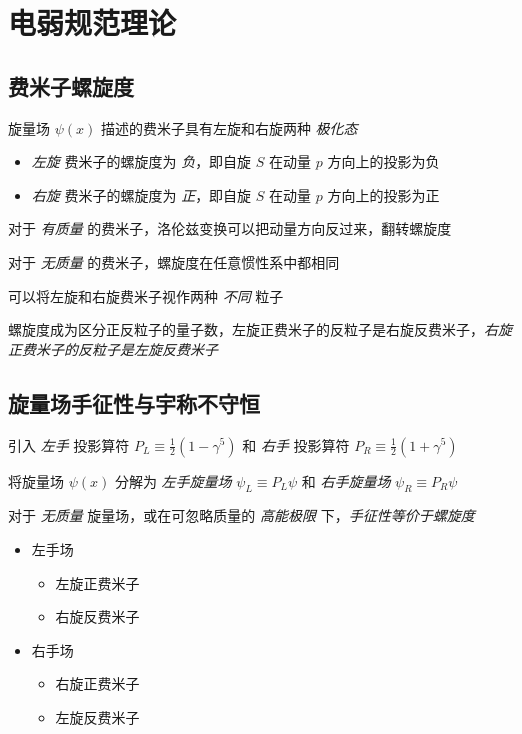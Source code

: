 \section{电弱规范理论}

\subsection{费米子螺旋度}

旋量场 $\psi(x)$ 描述的费米子具有左旋和右旋两种 \emph{极化态}

\begin{itemize}
    \item \emph{左旋} 费米子的螺旋度为 \emph{负}，即自旋 $S$ 在动量 $p$ 方向上的投影为负
    \item \emph{右旋} 费米子的螺旋度为 \emph{正}，即自旋 $S$ 在动量 $p$ 方向上的投影为正
\end{itemize}

对于 \emph{有质量} 的费米子，洛伦兹变换可以把动量方向反过来，翻转螺旋度

对于 \emph{无质量} 的费米子，螺旋度在任意惯性系中都相同

可以将左旋和右旋费米子视作两种 \emph{不同} 粒子

螺旋度成为区分正反粒子的量子数，左旋正费米子的反粒子是右旋反费米子，\emph{右旋正费米子的反粒子是左旋反费米子}

\subsection{旋量场手征性与宇称不守恒}

引入 \emph{左手} 投影算符 $P_L \equiv \frac{1}{2} (1-\gamma^5)$ 和 \emph{右手} 投影算符 $P_R \equiv \frac{1}{2} (1+\gamma^5)$

将旋量场 $\psi(x)$ 分解为 \emph{左手旋量场} $\psi_L \equiv P_L \psi$ 和 \emph{右手旋量场} $\psi_R \equiv P_R \psi$

对于 \emph{无质量} 旋量场，或在可忽略质量的 \emph{高能极限} 下，\emph{手征性等价于螺旋度}

\begin{itemize}
    \item 左手场
        \begin{itemize}
            \item 左旋正费米子
            \item 右旋反费米子
        \end{itemize}
    \item 右手场
        \begin{itemize}
            \item 右旋正费米子
            \item 左旋反费米子
        \end{itemize}
\end{itemize}

